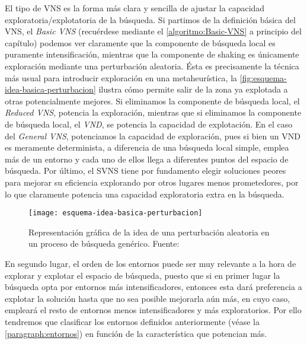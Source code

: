 El tipo de VNS es la forma más clara y sencilla de ajustar la capacidad exploratoria/explotatoria de la búsqueda. Si partimos de la definición básica del VNS, el \textit{Basic VNS} (recuérdese mediante el \autoref{algoritmo:Basic-VNS} a principio del capítulo) podemos ver claramente que la componente de búsqueda local es puramente intensificación, mientras que la componente de shaking es únicamente exploración mediante una perturbación aleatoria.
Ésta es precisamente la técnica más usual para introducir exploración en una metaheurística, la \autoref{fig:esquema-idea-basica-perturbacion} ilustra cómo permite salir de la zona ya explotada a otras potencialmente mejores.
Si eliminamos la componente de búsqueda local, el \textit{Reduced VNS}, potencia la exploración, mientras que si eliminamos la componente de búsqueda local, el \textit{VND}, se potencia la capacidad de explotación.
En el caso del \textit{General VNS}, potenciamos la capacidad de exploración, pues si bien un VND es meramente determinista, a diferencia de una búsqueda local simple, emplea más de un entorno y cada uno de ellos llega a diferentes puntos del espacio de búsqueda.
Por último, el SVNS tiene por fundamento elegir soluciones peores para mejorar su eficiencia explorando por otros lugares menos prometedores, por lo que claramente potencia una capacidad exploratoria extra en la búsqueda.

\begin{figure}
    \centering    \texttt{[image: esquema-idea-basica-perturbacion]}
    \caption[Representación gráfica de la idea de una perturbación aleatoria en un proceso de búsqueda genérico]{Representación gráfica de la idea de una perturbación aleatoria en un proceso de búsqueda genérico. Fuente:~\cite{sota:metaheuristicas-design-impl}}
    \label{fig:esquema-idea-basica-perturbacion}
\end{figure}

En segundo lugar, el orden de los entornos puede ser muy relevante a la hora de explorar y explotar el espacio de búsqueda, puesto que si en primer lugar la búsqueda opta por entornos más intensificadores, entonces esta dará preferencia a explotar la solución hasta que no sea posible mejorarla aún más, en cuyo caso, empleará el resto de entornos menos intensificadores y más exploratorios. Por ello tendremos que clasificar los entornos definidos anteriormente (véase la \autoref{paragraph:entornos}) en función de la característica que potencian más.

